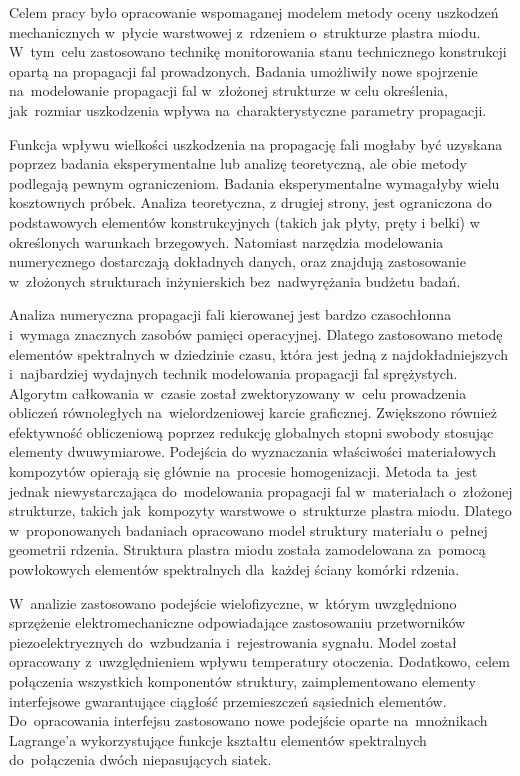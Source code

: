 {
Celem pracy było opracowanie wspomaganej modelem metody oceny uszko\-dzeń mechanicznych w~płycie warstwowej z~rdzeniem o~strukturze plastra miodu. W~tym~celu zastosowano technikę monitorowania stanu technicznego konstrukcji opartą na propagacji fal prowadzonych. Badania umożliwiły nowe spojrzenie na~modelowanie propagacji fal w~złożonej strukturze w celu określenia, jak~ro\-zmiar uszkodzenia wpływa na~charakterystyczne parametry propagacji.

Funkcja wpływu wielkości uszkodzenia na propagację fali mogłaby być uzyska\-na poprzez badania eksperymentalne lub analizę teoretyczną, ale obie metody pod\-legają pewnym ograniczeniom. Badania eksperymentalne wymagałyby wielu ko\-sztownych próbek. Analiza teoretyczna, z drugiej strony, jest ograniczona do pod\-stawowych ele\-mentów konstrukcyjnych (takich jak płyty, pręty i belki) w określonych warunkach brzegowych. Natomiast narzędzia modelowania numerycznego dostarczają dokładnych danych, oraz znajdują zastosowanie w~złożonych strukturach inżynierskich bez~nadwyrężania budżetu badań.

Analiza numeryczna propagacji fali kierowanej jest bardzo czasochłonna i~wy\-maga znacznych zasobów pamięci operacyjnej. Dlatego zastosowano metodę ele\-mentów spektralnych w dziedzinie czasu, która jest jedną z najdokładniejszych i~najbardziej wydajnych technik modelowania propagacji fal sprężystych. Algorytm całkowania w~czasie został zwektoryzowany w~celu prowadzenia obliczeń równoległych na~wielo\-rdzeniowej karcie graficznej. Zwiększono również efektywność obliczeniową poprzez redukcję globalnych stopni swobody stosując elementy dwuwymiarowe.
Podejścia do wyznaczania właściwości materiałowych kompozytów opierają się głównie na~procesie homogenizacji. Metoda ta~jest jednak niewystarczająca do~modelo\-wania propagacji fal w~materiałach o~złożonej strukturze, takich jak~ko\-mpozyty wa\-rstwowe o~strukturze plastra miodu. Dlatego w~proponowanych badaniach opraco\-wano model struktury materiału o~pełnej geometrii rdzenia. Struktura pla\-stra miodu została zamodelowana za~pomocą powłokowych elementów spektralnych dla~każdej ściany komó\-rki rdzenia.
\pagebreak

W~analizie zastosowano podejście wielofizyczne, w~którym uwzględniono sprzężenie elektromechaniczne odpowiadające zastosowaniu przetworników piezo\-elektrycznych do~wzbudzania i~rejestrowania sygnału. Model został opracowany z~u\-względnieniem wpływu temperatury otoczenia. Dodatkowo, celem połączenia wszystkich kompone\-ntów struktury, zaimplementowano elementy interfejsowe gwarantujące ciągłość przemie\-szczeń sąsiednich elementów. Do~opracowania interfejsu za\-stosowano nowe podejście oparte na~mnożnikach Lagrange'a wykorzystujące funkcje kształtu elementów spektra\-lnych do~po\-łączenia dwóch niepasujących siatek.

}
